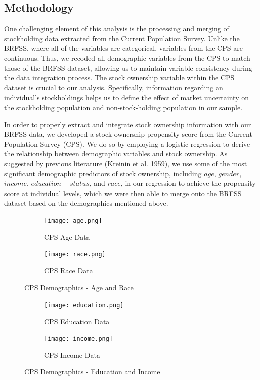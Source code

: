 \documentclass[11pt,a4paper,oldfontcommands]{memoir}
\begin{document}
{\subsection{Methodology}

One challenging element of this analysis is the processing and merging of stockholding data extracted from the Current Population Survey. Unlike the BRFSS, where all of the variables are categorical, variables from the CPS are continuous. Thus, we recoded all demographic variables from the CPS to match those of the BRFSS dataset, allowing us to maintain variable consistency during the data integration process. The stock ownership variable within the CPS dataset is crucial to our analysis. Specifically, information regarding an individual's stockholdings helps us to define the effect of market uncertainty on the stockholding population and non-stock-holding population in our sample.

In order to properly extract and integrate stock ownership information with our BRFSS data, we developed a stock-ownership propensity score from the Current Population Survey (CPS). We do so by employing a logistic regression to derive the relationship between demographic variables and stock ownership. As suggested by previous literature (Kreinin et al. 1959), we use some of the most significant demographic predictors of stock ownership, including $age$, $gender$, $income$, $education-status$, and $race$, in our regression to achieve the propensity score at individual levels, which we were then able to merge onto the BRFSS dataset based on the demographics mentioned above.


\begin{figure}[H]
\centering
\begin{subfigure}{.5\textwidth}
  \centering
  \texttt{[image: age.png]}
  \caption{CPS Age Data}
  \label{fig:age}
\end{subfigure}%
\begin{subfigure}{.5\textwidth}
  \centering
  \texttt{[image: race.png]}
  \caption{CPS Race Data}
  \label{fig:race}
\end{subfigure}
\caption{CPS Demographics - Age and Race}
\label{fig:age_race}
\end{figure}


\begin{figure}[H]
\centering
\begin{subfigure}{.5\textwidth}
  \centering
  \texttt{[image: education.png]}
  \caption{CPS Education Data}
  \label{fig:education}
\end{subfigure}%
\begin{subfigure}{.5\textwidth}
  \centering
  \texttt{[image: income.png]}
  \caption{CPS Income Data}
  \label{fig:income}
\end{subfigure}
\caption{CPS Demographics - Education and Income}
\label{fig:education_income}
\end{figure}



}
\end{document}
